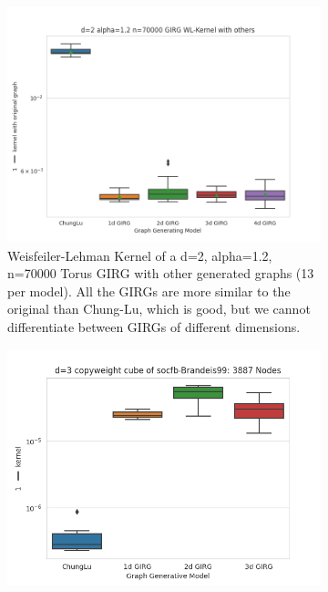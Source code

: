 
\begin{figure}
  \centering

  \begin{subfigure}{0.49 \textwidth}
    \centering
    \includegraphics[width=\linewidth]{figures/d=2 alpha=1.2 n=70000 GIRG WL-Kernel with others.png}
    \caption{Weisfeiler-Lehman Kernel of a d=2, alpha=1.2, n=70000 Torus GIRG with other generated graphs (13 per model). All the GIRGs are more similar to the original than Chung-Lu, which is good, but we cannot differentiate between GIRGs of different dimensions.}
    \label{fig:wl_kernel_gentorus}
  \end{subfigure}
  \hfill
  \begin{subfigure}{0.49 \textwidth}
    \centering
    \includegraphics[width=\linewidth]{figures/socfb-Brandeis99 d=3.png}

\end{subfigure}
\end{figure}
